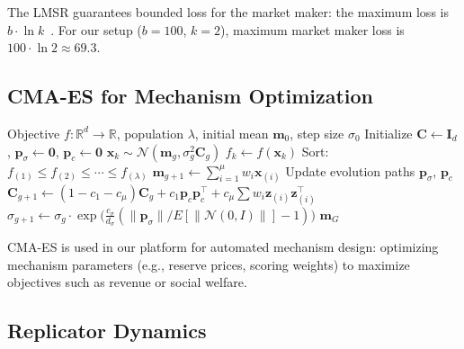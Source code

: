 \documentclass[10pt]{article}
\begin{document}
The LMSR guarantees bounded loss for the market maker: the maximum loss is $b \cdot \ln k$~\citep{hanson2003combinatorial}. For our setup ($b=100$, $k=2$), maximum market maker loss is $100 \cdot \ln 2 \approx 69.3$.

\subsection{CMA-ES for Mechanism Optimization}
\label{app:cmaes}

\begin{algorithm}[H]
\caption{Covariance Matrix Adaptation Evolution Strategy (CMA-ES)}
\label{alg:cmaes}
\begin{algorithmic}[1]
\REQUIRE Objective $f: \mathbb{R}^d \to \mathbb{R}$, population $\lambda$, initial mean $\mathbf{m}_0$, step size $\sigma_0$
\STATE Initialize $\mathbf{C} \leftarrow \mathbf{I}_d$, $\mathbf{p}_\sigma \leftarrow \mathbf{0}$, $\mathbf{p}_c \leftarrow \mathbf{0}$
    \STATE $\mathbf{x}_k \sim \mathcal{N}(\mathbf{m}_g, \sigma_g^2 \mathbf{C}_g)$
    \STATE $f_k \leftarrow f(\mathbf{x}_k)$
  \ENDFOR
  \STATE Sort: $f_{(1)} \leq f_{(2)} \leq \cdots \leq f_{(\lambda)}$
  \STATE $\mathbf{m}_{g+1} \leftarrow \sum_{i=1}^{\mu} w_i \mathbf{x}_{(i)}$ 
  \STATE Update evolution paths $\mathbf{p}_\sigma$, $\mathbf{p}_c$
  \STATE $\mathbf{C}_{g+1} \leftarrow (1-c_1-c_\mu)\mathbf{C}_g + c_1 \mathbf{p}_c \mathbf{p}_c^\top + c_\mu \sum w_i \mathbf{z}_{(i)} \mathbf{z}_{(i)}^\top$
  \STATE $\sigma_{g+1} \leftarrow \sigma_g \cdot \exp\!\bigl(\frac{c_\sigma}{d_\sigma}(\|\mathbf{p}_\sigma\|/E[\|\mathcal{N}(0,I)\|] - 1)\bigr)$
\ENDFOR
\RETURN $\mathbf{m}_G$
\end{algorithmic}
\end{algorithm}

CMA-ES is used in our platform for automated mechanism design: optimizing mechanism parameters (e.g., reserve prices, scoring weights) to maximize objectives such as revenue or social welfare.

\subsection{Replicator Dynamics}
\label{app:replicator}
\end{document}
